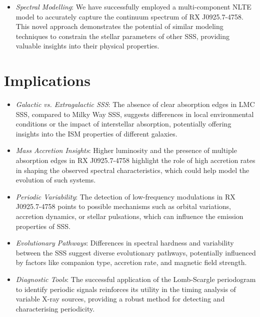 \begin{itemize}
    	\item \textit{Spectral Modelling}: We have successfully employed a multi-component NLTE model to accurately capture the continuum spectrum of RX J0925.7-4758. This novel approach demonstrates the potential of similar modeling techniques to constrain the stellar parameters of other SSS, providing valuable insights into their physical properties.
    \end{itemize}
    
    \section{Implications}
    	\begin{itemize}
    		\item \textit{Galactic vs. Extragalactic SSS}: The absence of clear absorption edges in LMC SSS, compared to Milky Way SSS, suggests differences in local environmental conditions or the impact of interstellar absorption, potentially offering insights into the ISM properties of different galaxies.
    		
    		\item \textit{Mass Accretion Insights}: Higher luminosity and the presence of multiple absorption edges in RX J0925.7-4758 highlight the role of high accretion rates in shaping the observed spectral characteristics, which could help model the evolution of such systems.
    		
    		\item \textit{Periodic Variability}: The detection of low-frequency modulations in RX J0925.7-4758 points to possible mechanisms such as orbital variations, accretion dynamics, or stellar pulsations, which can influence the emission properties of SSS.
    		
    		\item \textit{Evolutionary Pathways}: Differences in spectral hardness and variability between the SSS suggest diverse evolutionary pathways, potentially influenced by factors like companion type, accretion rate, and magnetic field strength.
    		
    		\item \textit{Diagnostic Tools}: The successful application of the Lomb-Scargle periodogram to identify periodic signals reinforces its utility in the timing analysis of variable X-ray sources, providing a robust method for detecting and characterising periodicity.
    	\end{itemize}
    
